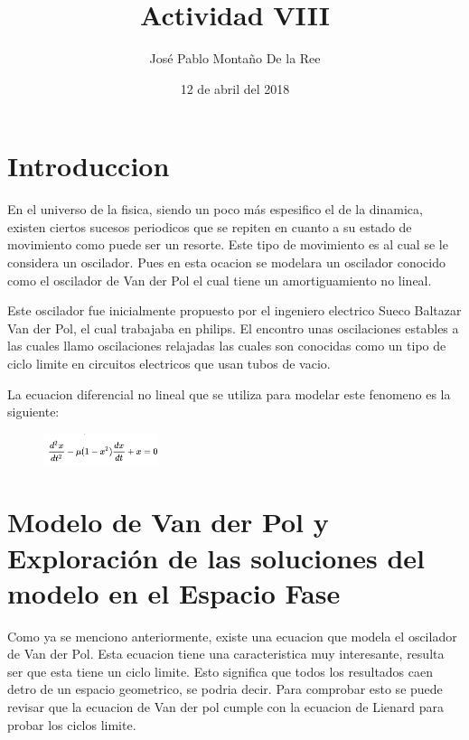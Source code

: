 \documentclass[a4paper]{article}
\title{Actividad VIII}
\author{José Pablo Montaño De la Ree}
\date{ 12 de abril del 2018}
\begin{document}
\maketitle



\section{Introduccion}

En el universo de la fisica, siendo un poco más espesifico el de la dinamica, existen ciertos sucesos periodicos que se repiten en cuanto a su estado de movimiento como puede ser un resorte. Este tipo de movimiento es al cual se le considera un oscilador. Pues en esta ocacion se modelara un oscilador conocido como el oscilador de Van der Pol el cual tiene un amortiguamiento no lineal.
 \linebreak
 
 Este oscilador fue inicialmente propuesto por el ingeniero electrico Sueco Baltazar Van der Pol, el cual trabajaba en philips. El encontro unas oscilaciones estables a las cuales llamo oscilaciones relajadas las cuales son conocidas como un tipo de ciclo limite en circuitos electricos que usan tubos de vacio. 
 
 La ecuacion diferencial no lineal que se utiliza para modelar este fenomeno es la siguiente:
 
 \begin{figure}[ht!]
\centering
\includegraphics[width=0.3\textwidth]{E1.png}
\end{figure}

\section{ Modelo de Van der Pol y Exploración de las soluciones del modelo en el Espacio Fase}

Como ya se menciono anteriormente, existe una ecuacion que modela el oscilador de Van der Pol. Esta ecuacion tiene una caracteristica muy interesante, resulta ser que esta tiene un ciclo limite. Esto significa que todos los resultados caen detro de un espacio geometrico, se podria decir. Para comprobar esto se puede revisar que la ecuacion de Van der pol cumple con la ecuacion de Lienard para probar los ciclos limite. 
\linebreak
\end{document}
